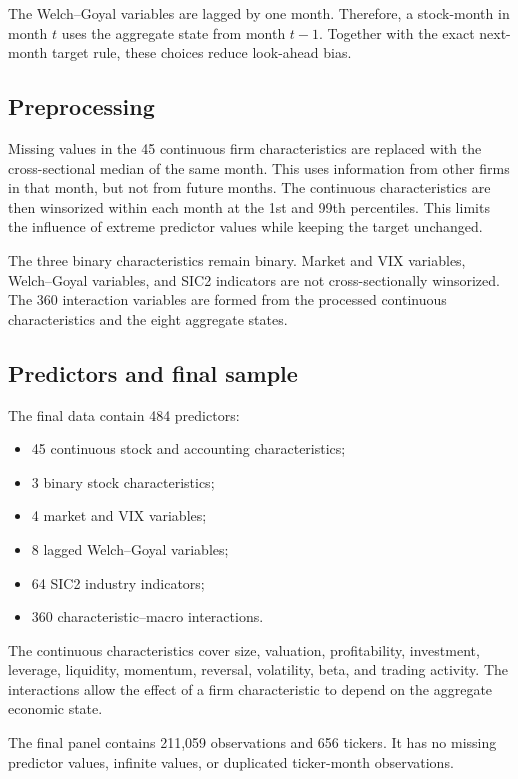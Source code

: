 \documentclass[11pt,a4paper]{article}
\begin{document}
The Welch--Goyal variables are lagged by one month. Therefore, a stock-month in
month \(t\) uses the aggregate state from month \(t-1\). Together with the
exact next-month target rule, these choices reduce look-ahead bias.

\subsection{Preprocessing}

Missing values in the 45 continuous firm characteristics are replaced with the
cross-sectional median of the same month. This uses information from other
firms in that month, but not from future months. The continuous characteristics
are then winsorized within each month at the 1st and 99th percentiles. This
limits the influence of extreme predictor values while keeping the target
unchanged.

The three binary characteristics remain binary. Market and VIX variables,
Welch--Goyal variables, and SIC2 indicators are not cross-sectionally
winsorized. The 360 interaction variables are formed from the processed
continuous characteristics and the eight aggregate states.

\subsection{Predictors and final sample}

The final data contain 484 predictors:

\begin{itemize}
  \item 45 continuous stock and accounting characteristics;
  \item 3 binary stock characteristics;
  \item 4 market and VIX variables;
  \item 8 lagged Welch--Goyal variables;
  \item 64 SIC2 industry indicators;
  \item 360 characteristic--macro interactions.
\end{itemize}

The continuous characteristics cover size, valuation, profitability,
investment, leverage, liquidity, momentum, reversal, volatility, beta, and
trading activity. The interactions allow the effect of a firm characteristic
to depend on the aggregate economic state.

The final panel contains 211,059 observations and 656 tickers. It has no missing
predictor values, infinite values, or duplicated ticker-month observations.
\end{document}
